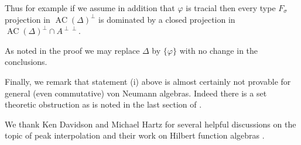 \documentclass[10pt]{amsart}
\renewcommand{\phi}{\varphi}
\newcommand{\AC}{\operatorname{AC}}
\theoremstyle{definition}
\begin{document}
Thus for example if we assume in addition that $\phi$ is tracial then every type $F_\sigma$ projection in $\AC(\Delta)^\perp$ is dominated by a closed 
projection in $\AC(\Delta)^\perp\cap A^{\perp\perp}$.

As noted in the proof we may replace  $\Delta$ by $\{ \phi \}$ with no change in the conclusions. 

Finally, we remark that statement (i) above 
 is almost certainly not provable for general (even commutative) von Neumann algebras.  Indeed there is a set theoretic
obstruction as is noted in the last section of \cite{BL2018}.


\medskip

We thank Ken Davidson and Michael Hartz for several   helpful discussions on the topic of peak interpolation and their work on Hilbert function algebras \cite{DH2023}.


 

\end{document}
